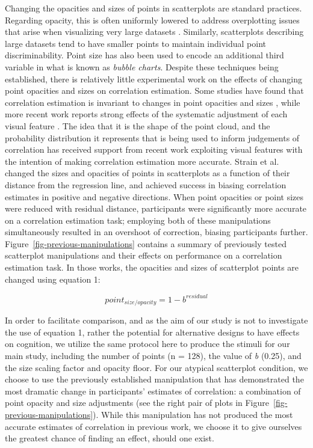 \documentclass[manuscript,screen,review,anonymous]{acmart}
\begin{document}
Changing the opacities and sizes of points in scatterplots are standard
practices. Regarding opacity, this is often uniformly lowered to address
overplotting issues that arise when visualizing very large datasets
\citep{matejka_2015}. Similarly, scatterplots describing large datasets
tend to have smaller points to maintain individual point
discriminability. Point size has also been used to encode an additional
third variable in what is known as \emph{bubble charts}. Despite these
techniques being established, there is relatively little experimental
work on the effects of changing point opacities and sizes on correlation
estimation. Some studies have found that correlation estimation is
invariant to changes in point opacities and sizes
\citep{rensink_2014, rensink_2017}, while more recent work reports
strong effects of the systematic adjustment of each visual feature
\citep{strain_2023, strain_2023b, strain_2024}. The idea that it is the
shape of the point cloud, and the probability distribution it represents
that is being used to inform judgements of correlation has received
support from recent work exploiting visual features with the intention
of making correlation estimation more accurate. Strain et al.
\citep{strain_2023, strain_2023b, strain_2024} changed the sizes and
opacities of points in scatterplots as a function of their distance from
the regression line, and achieved success in biasing correlation
estimates in positive and negative directions. When point opacities
\citep{strain_2023} or point sizes \citep{strain_2023b} were reduced
with residual distance, participants were significantly more accurate on
a correlation estimation task; employing both of these manipulations
simultaneously \citep{strain_2024} resulted in an overshoot of
correction, biasing participants further.
Figure~\ref{fig-previous-manipulations} contains a summary of previously
tested scatterplot manipulations and their effects on performance on a
correlation estimation task. In those works, the opacities and sizes of
scatterplot points are changed using equation 1:

\begin{equation}
  point_{size/opacity} = 1 - b^{residual}
\end{equation}

In order to facilitate comparison, and as the aim of our study is not to
investigate the use of equation 1, rather the potential for alternative
designs to have effects on cognition, we utilize the same protocol here
to produce the stimuli for our main study, including the number of
points (n = 128), the value of \emph{b} (0.25), and the size scaling
factor and opacity floor. For our atypical scatterplot condition, we
choose to use the previously established manipulation that has
demonstrated the most dramatic change in participants' estimates of
correlation: a combination of point opacity and size adjustments
\citep{strain_2024} (see the right pair of plots in
Figure~\ref{fig-previous-manipulations}). While this manipulation has
not produced the most accurate estimates of correlation in previous
work, we choose it to give ourselves the greatest chance of finding an
effect, should one exist.
\end{document}
